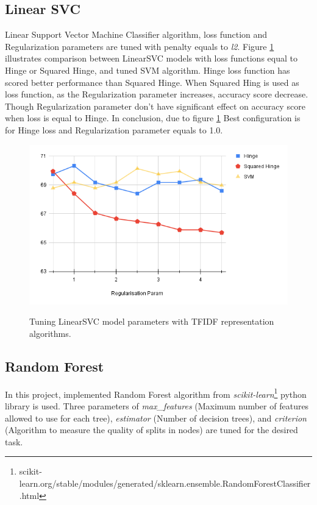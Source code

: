 \subsection{Linear SVC}
Linear Support Vector Machine Classifier algorithm, loss function and Regularization parameters are tuned with penalty equals to \textit{l2}. Figure \ref{fig:linearsvm} illustrates comparison between LinearSVC models with loss functions equal to Hinge or Squared Hinge, and tuned \ac{SVM} algorithm. Hinge loss function has scored better performance than Squared Hinge. When Squared Hing is used as loss function, as the Regularization parameter increases, accuracy score decrease. Though Regularization parameter don't have significant effect on accuracy score when loss is equal to Hinge. In conclusion, due to figure \ref{fig:linearsvm} Best configuration is for Hinge loss and Regularization parameter equals to 1.0. 
\begin{figure}%
	\centering
	{\includegraphics[width=12.5cm]{statistics/linearsvm.png} }
	\caption{Tuning LinearSVC model parameters with \ac{TFIDF} representation algorithms.}%
	\label{fig:linearsvm}%
\end{figure}
\subsection{Random Forest}
In this project, implemented Random Forest algorithm from \textit{scikit-learn}\footnote{scikit-learn.org/stable/modules/generated/sklearn.ensemble.RandomForestClassifier.html} python library is used. Three parameters of \textit{max\_features} (Maximum number of features allowed to use for each tree), \textit{estimator} (Number of decision trees), and \textit{criterion} (Algorithm to measure the quality of splits in nodes) are tuned for the desired task.


